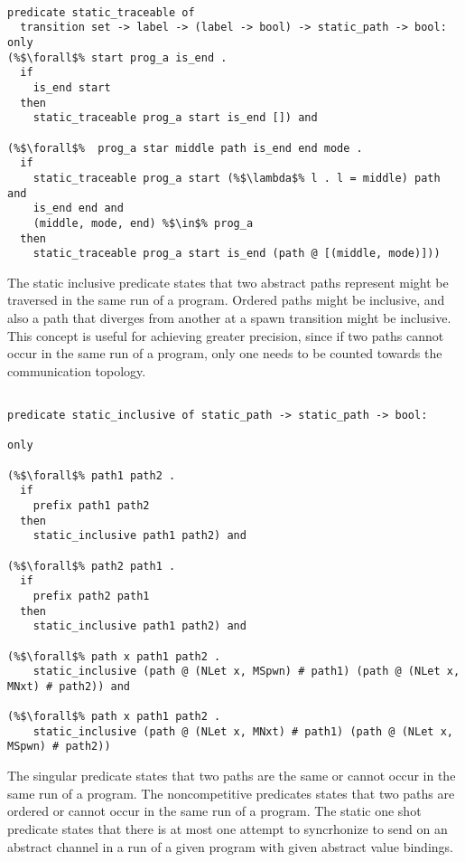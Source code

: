 \documentclass{article}
\begin{document}
\begin{lstlisting}[language=logic, escapechar=\%]

predicate static_traceable of
  transition set -> label -> (label -> bool) -> static_path -> bool:
only
(%$\forall$% start prog_a is_end .
  if
    is_end start
  then
    static_traceable prog_a start is_end []) and

(%$\forall$%  prog_a star middle path is_end end mode .
  if 
    static_traceable prog_a start (%$\lambda$% l . l = middle) path and
    is_end end and
    (middle, mode, end) %$\in$% prog_a 
  then
    static_traceable prog_a start is_end (path @ [(middle, mode)]))

\end{lstlisting}


The static inclusive predicate states that two abstract paths represent might be traversed in
the same run of a program. Ordered paths might be inclusive, and also a path that diverges
from another at a spawn transition might be inclusive.  This concept is useful for achieving
greater precision, since if two paths cannot occur in the same run of a program, only one needs
to be counted towards the communication topology. 


\begin{lstlisting}[language=logic, escapechar=\%]

predicate static_inclusive of static_path -> static_path -> bool:

only

(%$\forall$% path1 path2 .
  if
    prefix path1 path2
  then
    static_inclusive path1 path2) and

(%$\forall$% path2 path1 .
  if
    prefix path2 path1
  then
    static_inclusive path1 path2) and

(%$\forall$% path x path1 path2 .
    static_inclusive (path @ (NLet x, MSpwn) # path1) (path @ (NLet x, MNxt) # path2)) and

(%$\forall$% path x path1 path2 .
    static_inclusive (path @ (NLet x, MNxt) # path1) (path @ (NLet x, MSpwn) # path2))

\end{lstlisting}


The singular predicate states that two paths are the same or cannot occur in the same run of a
program. The noncompetitive predicates states that two paths are ordered or cannot occur in the
same run of a program. The static one shot predicate states that there is at most one attempt
to syncrhonize to send on an abstract channel in a run of a given program with given abstract
value bindings.
\end{document}
